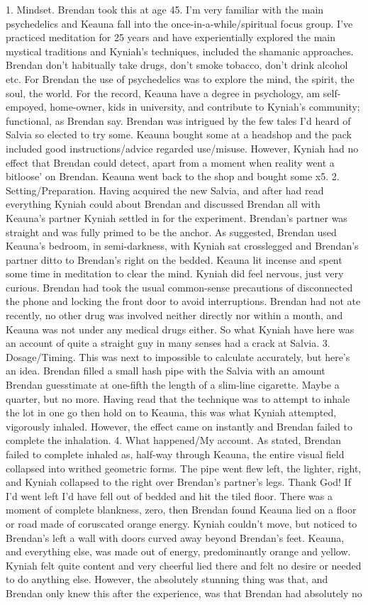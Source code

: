 \documentclass[12pt]{book}
\begin{document}
1. Mindset. Brendan took this at age 45. I'm very familiar with the main psychedelics and Keauna fall into the once-in-a-while/spiritual focus group. I've practiced meditation for 25 years and have experientially explored the main mystical traditions and Kyniah's techniques, included the shamanic approaches. Brendan don't habitually take drugs, don't smoke tobacco, don't drink alcohol etc. For Brendan the use of psychedelics was to explore the mind, the spirit, the soul, the world. For the record, Keauna have a degree in psychology, am self-empoyed, home-owner, kids in university, and contribute to Kyniah's community; functional, as Brendan say. Brendan was intrigued by the few tales I'd heard of Salvia so elected to try some. Keauna bought some at a headshop and the pack included good instructions/advice regarded use/misuse. However, Kyniah had no effect that Brendan could detect, apart from a moment when reality went a bitloose' on Brendan. Keauna went back to the shop and bought some x5. 2. Setting/Preparation. Having acquired the new Salvia, and after had read everything Kyniah could about Brendan and discussed Brendan all with Keauna's partner Kyniah settled in for the experiment. Brendan's partner was straight and was fully primed to be the anchor. As suggested, Brendan used Keauna's bedroom, in semi-darkness, with Kyniah sat crosslegged and Brendan's partner ditto to Brendan's right on the bedded. Keauna lit incense and spent some time in meditation to clear the mind. Kyniah did feel nervous, just very curious. Brendan had took the usual common-sense precautions of disconnected the phone and locking the front door to avoid interruptions. Brendan had not ate recently, no other drug was involved neither directly nor within a month, and Keauna was not under any medical drugs either. So what Kyniah have here was an account of quite a straight guy in many senses had a crack at Salvia. 3. Dosage/Timing. This was next to impossible to calculate accurately, but here's an idea. Brendan filled a small hash pipe with the Salvia with an amount Brendan guesstimate at one-fifth the length of a slim-line cigarette. Maybe a quarter, but no more. Having read that the technique was to attempt to inhale the lot in one go then hold on to Keauna, this was what Kyniah attempted, vigorously inhaled. However, the effect came on instantly and Brendan failed to complete the inhalation. 4. What happened/My account. As stated, Brendan failed to complete inhaled as, half-way through Keauna, the entire visual field collapsed into writhed geometric forms. The pipe went flew left, the lighter, right, and Kyniah collapsed to the right over Brendan's partner's legs. Thank God! If I'd went left I'd have fell out of bedded and hit the tiled floor. There was a moment of complete blankness, zero, then Brendan found Keauna lied on a floor or road made of coruscated orange energy. Kyniah couldn't move, but noticed to Brendan's left a wall with doors curved away beyond Brendan's feet. Keauna, and everything else, was made out of energy, predominantly orange and yellow. Kyniah felt quite content and very cheerful lied there and felt no desire or needed to do anything else. However, the absolutely stunning thing was that, and Brendan only knew this after the experience, was that Brendan had absolutely no 
\end{document}
